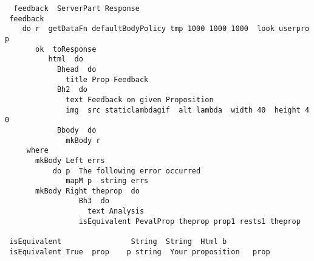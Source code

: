 \documentclass{article}
\begin{document}
\begin{tabbing}\tt
~feedback~~ServerPart~Response\\
\tt ~feedback~~\\
\tt ~~~~do~r~~getDataFn~defaultBodyPolicy~tmp~1000~1000~1000~~look~userprop\\
\tt ~~~~~~~ok~~toResponse~\\
\tt ~~~~~~~~~~html~~do\\
\tt ~~~~~~~~~~~~Bhead~~do\\
\tt ~~~~~~~~~~~~~~title~Prop~Feedback\\
\tt ~~~~~~~~~~~~Bh2~~do\\
\tt ~~~~~~~~~~~~~~text~Feedback~on~given~Proposition~~~~~~~~~~~\\
\tt ~~~~~~~~~~~~~~img~~src~staticlambdagif~~alt~lambda~~width~40~~height~40\\
\tt ~~~~~~~~~~~~Bbody~~do\\
\tt ~~~~~~~~~~~~~~mkBody~r\\
\tt ~~~~~where\\
\tt ~~~~~~~mkBody~Left~errs~\\
\tt ~~~~~~~~~~~do~p~~The~following~error~occurred\\
\tt ~~~~~~~~~~~~~~mapM~p~~string~errs\\
\tt ~~~~~~~mkBody~Right~theprop~~do\\
\tt ~~~~~~~~~~~~~~~~~Bh3~~do\\
\tt ~~~~~~~~~~~~~~~~~~~text~Analysis\\
\tt ~~~~~~~~~~~~~~~~~isEquivalent~PevalProp~theprop~prop1~rests1~theprop\\
\tt ~\\
\tt ~isEquivalent~~~~~~~~~~~~~~~~String~~String~~Html~b\\
\tt ~isEquivalent~True~~prop~~~~p~string~~Your~proposition~~~prop~~\\

\end{tabbing}
\end{document}

